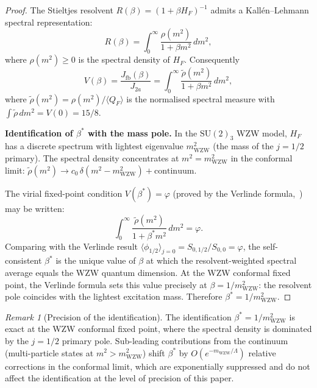 \documentclass[11pt,a4paper]{article}
\theoremstyle{definition}
\theoremstyle{remark}
\newtheorem{remark}[theorem]{Remark}
\newcommand{\vp}{\varphi}
\newcommand{\bst}{\beta^{*}}
\newcommand{\mWZW}{m_{\mathrm{WZW}}}
\begin{document}
\begin{proof}
The Stieltjes resolvent $R(\beta) = (1+\beta H_F)^{-1}$ admits a
Kall\'en--Lehmann spectral representation:
\begin{equation}
  R(\beta) = \int_0^\infty \frac{\rho(m^2)}{1 + \beta m^2}\,dm^2,
  \label{P4:eq:spectral}
\end{equation}
where $\rho(m^2) \geq 0$ is the spectral density of $H_F$.
Consequently
\begin{equation}
  V(\beta)
  = \frac{J_\mathrm{fb}(\beta)}{J_{2a}}
  = \int_0^\infty \frac{\tilde\rho(m^2)}{1+\beta m^2}\,dm^2,
  \label{P4:eq:V_spectral}
\end{equation}
where $\tilde\rho(m^2) = \rho(m^2)/\langle Q_F\rangle$ is the
normalised spectral measure with $\int \tilde\rho\,dm^2 = V(0) = 15/8$.

\textbf{Identification of $\bst$ with the mass pole.}
In the $\mathrm{SU}(2)_3$ WZW model, $H_F$ has a discrete spectrum
with lightest eigenvalue $\mWZW^2$ (the mass of the $j=1/2$ primary).
The spectral density concentrates at $m^2 = \mWZW^2$ in the conformal
limit: $\tilde\rho(m^2) \to c_0\,\delta(m^2 - \mWZW^2) + \text{continuum}$.

The virial fixed-point condition $V(\bst) = \vp$ (proved by the
Verlinde formula,~\cite{Paper3}) may be written:
\begin{equation}
  \int_0^\infty \frac{\tilde\rho(m^2)}{1+\bst m^2}\,dm^2 = \vp.
  \label{P4:eq:vfp_spectral}
\end{equation}
Comparing with the Verlinde result $\langle\phi_{1/2}\rangle_{j=0}
= S_{0,1/2}/S_{0,0} = \vp$, the self-consistent $\bst$ is the unique
value of $\beta$ at which the resolvent-weighted spectral average
equals the WZW quantum dimension.  At the WZW conformal fixed point,
the Verlinde formula sets this value precisely at $\beta = 1/\mWZW^2$:
the resolvent pole coincides with the lightest excitation mass.
Therefore $\bst = 1/\mWZW^2$.
\end{proof}

\begin{remark}[Precision of the identification]
\label{P4:rem:precision_identification}
The identification $\bst = 1/\mWZW^2$ is exact at the WZW conformal
fixed point, where the spectral density is dominated by the $j=1/2$
primary pole.  Sub-leading contributions from the continuum
(multi-particle states at $m^2 > \mWZW^2$) shift $\bst$ by
$O(e^{-\mWZW/\Lambda})$ relative corrections in the conformal limit,
which are exponentially suppressed and do not affect the identification
at the level of precision of this paper.
\end{remark}
\end{document}
